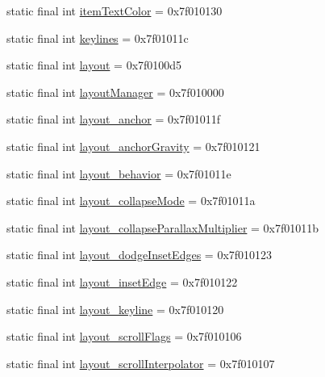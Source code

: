 \begin{CompactItemize}
\item 
static final int \hyperlink{classandroid_1_1support_1_1coreutils_1_1_r_1_1attr_24f4af0176760e5716dcc6bfce83def5}{itemTextColor} = 0x7f010130
\item 
static final int \hyperlink{classandroid_1_1support_1_1coreutils_1_1_r_1_1attr_7953a1feda6707414506b7d489f135b6}{keylines} = 0x7f01011c
\item 
static final int \hyperlink{classandroid_1_1support_1_1coreutils_1_1_r_1_1attr_90332abda34dda49798402cd9446aa6d}{layout} = 0x7f0100d5
\item 
static final int \hyperlink{classandroid_1_1support_1_1coreutils_1_1_r_1_1attr_f3f01febda4258b4b30ca2ce8405e977}{layoutManager} = 0x7f010000
\item 
static final int \hyperlink{classandroid_1_1support_1_1coreutils_1_1_r_1_1attr_fadefde7cbf1880326fbee6b8cd3b700}{layout\_\-anchor} = 0x7f01011f
\item 
static final int \hyperlink{classandroid_1_1support_1_1coreutils_1_1_r_1_1attr_83a7f0ba8cfc0818c96cf10b3d1a82c6}{layout\_\-anchorGravity} = 0x7f010121
\item 
static final int \hyperlink{classandroid_1_1support_1_1coreutils_1_1_r_1_1attr_85a9b8d9d5aa7ae5efc4b20c3fb96ccc}{layout\_\-behavior} = 0x7f01011e
\item 
static final int \hyperlink{classandroid_1_1support_1_1coreutils_1_1_r_1_1attr_34c775961d4cde1ae17e2f5f559baf3c}{layout\_\-collapseMode} = 0x7f01011a
\item 
static final int \hyperlink{classandroid_1_1support_1_1coreutils_1_1_r_1_1attr_239b822a7e5318d7ec5298f66f6b8b67}{layout\_\-collapseParallaxMultiplier} = 0x7f01011b
\item 
static final int \hyperlink{classandroid_1_1support_1_1coreutils_1_1_r_1_1attr_a7d8b08c712ae3f111e52bfa6446a6fc}{layout\_\-dodgeInsetEdges} = 0x7f010123
\item 
static final int \hyperlink{classandroid_1_1support_1_1coreutils_1_1_r_1_1attr_ba2547679b87c137bf6438e34b9b4a58}{layout\_\-insetEdge} = 0x7f010122
\item 
static final int \hyperlink{classandroid_1_1support_1_1coreutils_1_1_r_1_1attr_21bc8b76ae561d732ecd669794f4453f}{layout\_\-keyline} = 0x7f010120
\item 
static final int \hyperlink{classandroid_1_1support_1_1coreutils_1_1_r_1_1attr_ef7a62f1aa2fd867e6fd3c211fb8ad67}{layout\_\-scrollFlags} = 0x7f010106
\item 
static final int \hyperlink{classandroid_1_1support_1_1coreutils_1_1_r_1_1attr_ada22b95ac4b8990e5b6bd26dae9283e}{layout\_\-scrollInterpolator} = 0x7f010107

\end{CompactItemize}
